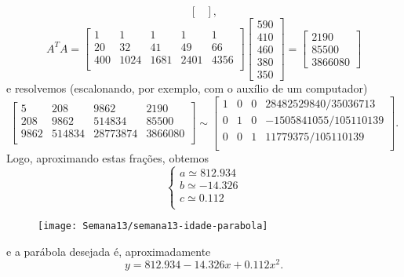 \begin{ex}
\begin{equation}
\begin{bmatrix}
  \end{bmatrix},
  \end{equation}
  \begin{equation}
  A^T A =
  \begin{bmatrix}
    1 & 1 & 1 & 1 & 1 \\
    20 & 32 & 41 & 49 & 66 \\
    400 & 1024 & 1681 & 2401 & 4356 \\
  \end{bmatrix}
  \begin{bmatrix}
    590 \\ 410 \\ 460 \\ 380 \\ 350
  \end{bmatrix} =
  \begin{bmatrix}
    2190 \\ 85500 \\ 3866080
  \end{bmatrix}
  \end{equation} e resolvemos (escalonando, por exemplo, com o auxílio de um computador)
  \begin{equation}
  \begin{bmatrix}
    5 & 208 & 9862 & 2190 \\
    208 & 9862 & 514834 & 85500 \\
    9862 & 514834 & 28773874 & 3866080 \\
  \end{bmatrix} \sim
  \begin{bmatrix}
    1 & 0 & 0 & 28482529840/35036713 \\
    0 & 1 & 0 & -1505841055/105110139 \\
    0 & 0 & 1 & 11779375/105110139 \\
  \end{bmatrix}.
  \end{equation}
  Logo, aproximando estas frações, obtemos
  \begin{equation}
  \left\{
    \begin{array}{ll}
      a \simeq 812.934 \\
      b \simeq -14.326 \\
      c \simeq  0.112 \\
    \end{array}
  \right.
  \end{equation}
  \begin{figure}[h!]
  	\begin{center}
  		\texttt{[image: Semana13/semana13-idade-parabola]}
  	\end{center}
  \end{figure}
  e a parábola desejada é, aproximadamente
  \begin{equation}
  y = 812.934 - 14.326 x + 0.112 x^2.
  \end{equation}



\end{ex}
